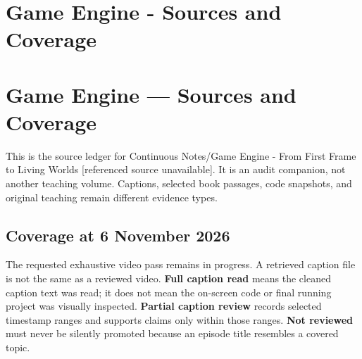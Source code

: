\hypertarget{appendix-877738f6f4d2}{}
\section*{Game Engine - Sources and Coverage}
\section{Game Engine --- Sources and Coverage}\label{appendix-877738f6f4d2-game-engine-sources-and-coverage}

This is the source ledger for {Continuous Notes/Game Engine - From First Frame to Living Worlds {[}referenced source unavailable{]}}. It is an audit companion, not another teaching volume. Captions, selected book passages, code snapshots, and original teaching remain different evidence types.

\subsection{Coverage at 6 November 2026}\label{appendix-877738f6f4d2-coverage-at-6-november-2026}

The requested exhaustive video pass remains in progress. A retrieved caption file is not the same as a reviewed video. \textbf{Full caption read} means the cleaned caption text was read; it does not mean the on-screen code or final running project was visually inspected. \textbf{Partial caption review} records selected timestamp ranges and supports claims only within those ranges. \textbf{Not reviewed} must never be silently promoted because an episode title resembles a covered topic.

